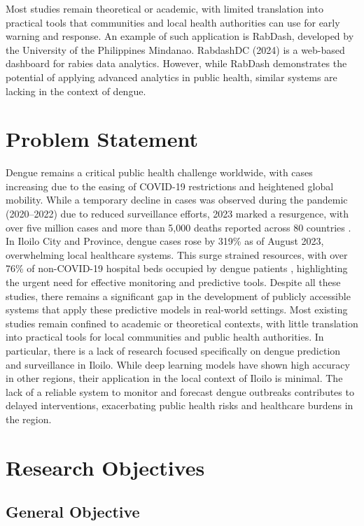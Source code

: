 Most studies remain theoretical or academic, with limited translation into practical tools that communities and local health authorities can use for early warning and response. An example of such application is RabDash, developed by the University of the Philippines Mindanao. RabdashDC (2024) is a web-based dashboard for rabies data analytics. However, while RabDash demonstrates the potential of applying advanced analytics in public health, similar systems are lacking in the context of dengue. 

\section{Problem Statement}
Dengue remains a critical public health challenge worldwide, with cases increasing due to the easing of COVID-19 restrictions and heightened global mobility. While a temporary decline in cases was observed during the pandemic (2020–2022) due to reduced surveillance efforts, 2023 marked a resurgence, with over five million cases and more than 5,000 deaths reported across 80 countries \cite{bosano2023who}. In Iloilo City and Province, dengue cases rose by 319\% as of August 2023, overwhelming local healthcare systems. This surge strained resources, with over 76\% of non-COVID-19 hospital beds occupied by dengue patients \cite{lena2024}, highlighting the urgent need for effective monitoring and predictive tools. Despite all these studies, there remains a significant gap in the development of publicly accessible systems that apply these predictive models in real-world settings.  Most existing studies remain confined to academic or theoretical contexts, with little translation into practical tools for local communities and public health authorities. In particular, there is a lack of research focused specifically on dengue prediction and surveillance in Iloilo. While deep learning models have shown high accuracy in other regions, their application in the local context of Iloilo is minimal. The lack of a reliable system to monitor and forecast dengue outbreaks contributes to delayed interventions, exacerbating public health risks and healthcare burdens in the region. 


\section{Research Objectives}
\label{sec:researchobjectives}

\subsection{General Objective}
\label{sec:generalobjective}

